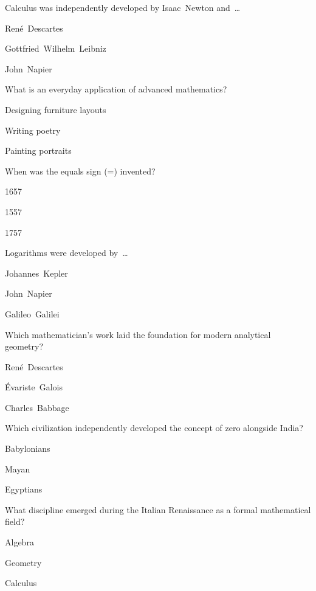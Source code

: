 \begin{enhancedmcq}{Calculus was independently developed by Isaac Newton and …}
\item René Descartes
\item Gottfried Wilhelm Leibniz
\item John Napier

\end{enhancedmcq}
\begin{enhancedmcq}{What is an everyday application of advanced mathematics?}
\item Designing furniture layouts
\item Writing poetry
\item Painting portraits

\end{enhancedmcq}
\begin{enhancedmcq}{When was the equals sign (=) invented?}
\item 1657
\item 1557
\item 1757

\end{enhancedmcq}
\begin{enhancedmcq}{Logarithms were developed by …}
\item Johannes Kepler
\item John Napier
\item Galileo Galilei

\end{enhancedmcq}
\begin{enhancedmcq}{Which mathematician's work laid the foundation for modern analytical geometry?}
\item René Descartes
\item Évariste Galois
\item Charles Babbage

\end{enhancedmcq}
\begin{enhancedmcq}{Which civilization independently developed the concept of zero alongside India?}
\item Babylonians
\item Mayan
\item Egyptians

\end{enhancedmcq}
\begin{enhancedmcq}{What discipline emerged during the Italian Renaissance as a formal mathematical field?}
\item Algebra
\item Geometry
\item Calculus

\end{enhancedmcq}
